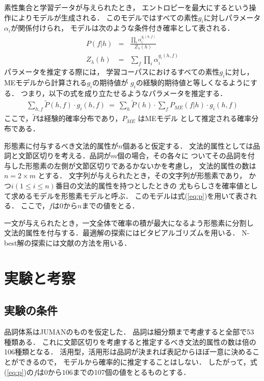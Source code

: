 素性集合と学習データが与えられたとき，
エントロピーを最大にするという操作によりモデルが生成される．
このモデルではすべての素性$g_i$に対しパラメータ$\alpha_i$が関係付けられ，
モデルは次のような条件付き確率として表される\cite{berger:cl96}．
\begin{eqnarray}
  \label{eq:p}
  P(f|h) & = & \frac{\prod_{i}\alpha_{i}^{g_{i}(h,f)}}{Z_{\lambda}(h)} \\
  Z_{\lambda}(h) & = & \sum_f \prod_{i}\alpha_{i}^{g_{i}(h,f)}
\end{eqnarray}
パラメータを推定する際には，
学習コーパスにおけるすべての素性$g_i$に対し，
MEモデルから計算される$g_i$の期待値が
$g_i$の経験的期待値と等しくなるようにする．
つまり，以下の式を成り立たせるようなパラメータを推定する．
\begin{eqnarray}
  \label{eq:constraint}
  \sum_{h,f}\tilde{P}(h,f)\cdot g_{i}(h,f) 
  \ = \ \sum_{h}\tilde{P}(h)\cdot \sum_{f}P_{ME}(f|h)\cdot g_{i}(h,f)
\end{eqnarray}
ここで，$\tilde{P}$は経験的確率分布であり，$P_{ME}$ はMEモデル
として推定される確率分布である．

形態素に付与するべき文法的属性が$n$個あると仮定する．
文法的属性としては品詞と文節区切りを考える．品詞が$m$個の場合，その各々に
ついてその品詞を付与した形態素の左側が文節区切りであるかないかを考慮し，
文法的属性の数は$n=2\times m$ とする．
文字列が与えられたとき，その文字列が形態素であり，
かつ$i$$(1\leq i \leq n)$番目の文法的属性を持つとしたときの
尤もらしさを確率値として求めるモデルを形態素モデルと呼ぶ．
このモデルは式(\ref{eq:p})を用いて表される．
ここで，$f$は0から$n$までの値をとる．

一文が与えられたとき，一文全体で確率の積が最大になるよう形態素に分割し
文法的属性を付与する．最適解の探索にはビタビアルゴリズムを用いる．
N-best解の探索には文献\cite{Nagata:94}の方法を用いる．

\section{実験と考察}
\label{sec:exp_discussion}

\subsection{実験の条件}
\label{sec:exp_condition}

品詞体系はJUMAN\cite{juman3.61}のものを仮定した．
品詞は細分類まで考慮すると全部で53種類ある．
これに文節区切りを考慮すると推定するべき文法的属性の数は倍の106種類となる．
活用型，活用形は品詞が決まれば表記からほぼ一意に決めることができるので，
モデルから確率的に推定することはしない．
したがって，式(\ref{eq:p})の$f$は$0$から$106$までの107個の値をとるものとする．

